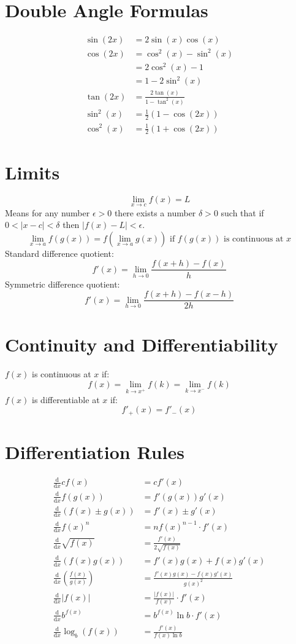 \documentclass[12pt]{article}
\newcommand*{\rmaskip}{\setlength{\abovedisplayskip}{0pt}}
\newcommand*{\rmbskip}{\setlength{\belowdisplayskip}{0pt}}
\newcommand*{\rmskip}{\rmaskip \rmbskip}
\newcommand*{\dd}[3][]{\tfrac{\mathrm{d}^{#1}#2}{\mathrm{d}#3^{#1}}}
\begin{document}
\section*{Double Angle Formulas}
{\rmskip\begin{align*}
  \sin(2x) &= 2\sin(x)\cos(x)\\
  \cos(2x) &= \cos^2(x) - \sin^2(x)\\
    &= 2\cos^2(x) - 1\\
    &= 1-2\sin^2(x)\\
  \tan(2x) &= \frac{2\tan(x)}{1 - \tan^2(x)}\\
  \sin^2(x) &= \frac{1}{2}(1-\cos(2x))\\
  \cos^2(x) &= \frac{1}{2}(1+\cos(2x))
\end{align*}}%
\section*{Limits}
\[
  \lim_{x \to c} f(x) = L
\]
Means for any number \(\epsilon > 0\) there exists a number \(\delta > 0\) such
that if \(0 < |x - c| < \delta\) then \(|f(x) - L| < \epsilon\).
\[
  \lim_{x \to a}f(g(x)) = f\left(\lim_{x \to a}g(x)\right) \text{ if } f(g(x))
  \text{ is continuous at } x
\]
Standard difference quotient:
\[
  f'(x) = \lim_{h \to 0}\frac{f(x+h) - f(x)}{h}
\]
Symmetric difference quotient:
\[
  f'(x) = \lim_{h \to 0}\frac{f(x+h) - f(x-h)}{2h}
\]
\section*{Continuity and Differentiability}
\(f(x)\) is continuous at \(x\) if:
\[
  f(x) = \lim_{k \to x^+}f(k) = \lim_{k \to x^-}f(k)
\]
\(f(x)\) is differentiable at \(x\) if:
\[
  f'_+(x) = f'_-(x)
\]
\section*{Differentiation Rules}
{\rmskip\begin{align*}
  \dd{}{x}c f(x) &= c f'(x)\\
  \dd{}{x}f(g(x)) &= f'(g(x))g'(x)\\
  \dd{}{x}(f(x) \pm g(x)) &= f'(x) \pm g'(x)\\
  \dd{}{x}f(x)^n &= nf(x)^{n-1} \cdot f'(x)\\
  \dd{}{x}\sqrt{f(x)} &= \frac{f'(x)}{2\sqrt{f(x)}}\\
  \dd{}{x}(f(x)g(x)) &= f'(x)g(x) + f(x)g'(x)\\
  \dd{}{x}\left(\frac{f(x)}{g(x)}\right) &= \frac{f'(x)g(x) - f(x)g'(x)}
    {g(x)^2}\\
  \dd{}{x}|f(x)| &= \frac{|f(x)|}{f(x)} \cdot f'(x)\\
  \dd{}{x}b^{f(x)} &= b^{f(x)} \ln b \cdot f'(x)\\
  \dd{}{x}\log_b(f(x)) &= \frac{f'(x)}{f(x) \ln b}
\end{align*}}%
\end{document}
